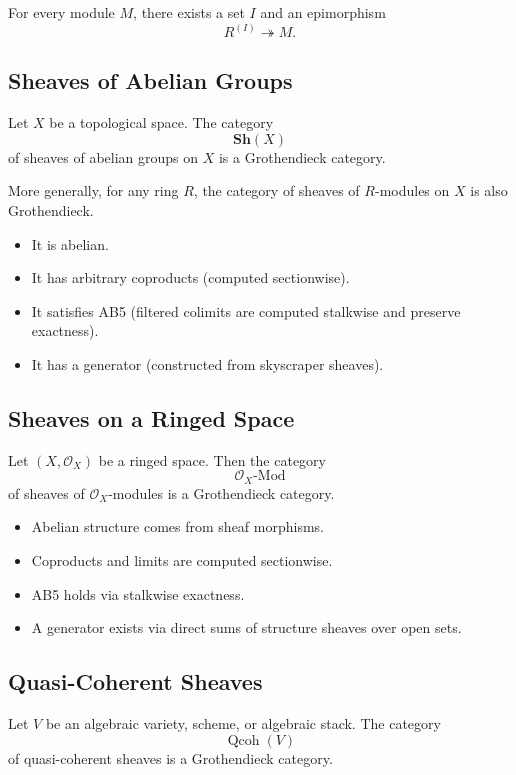 For every module $M$, there exists a set $I$ and an epimorphism
\[
R^{(I)} \twoheadrightarrow M.
\]

\subsection{Sheaves of Abelian Groups}

Let $X$ be a topological space. The category
\[
\mathbf{Sh}(X)
\]
of sheaves of abelian groups on $X$ is a Grothendieck category.

More generally, for any ring $R$, the category of sheaves of $R$-modules on $X$ is also Grothendieck.

\begin{itemize}
    \item It is abelian.
    \item It has arbitrary coproducts (computed sectionwise).
    \item It satisfies AB5 (filtered colimits are computed stalkwise and preserve exactness).
    \item It has a generator (constructed from skyscraper sheaves).
\end{itemize}

\subsection{Sheaves on a Ringed Space}

Let $(X, \mathcal{O}_X)$ be a ringed space. Then the category
\[
\mathcal{O}_X\text{-Mod}
\]
of sheaves of $\mathcal{O}_X$-modules is a Grothendieck category.

\begin{itemize}
    \item Abelian structure comes from sheaf morphisms.
    \item Coproducts and limits are computed sectionwise.
    \item AB5 holds via stalkwise exactness.
    \item A generator exists via direct sums of structure sheaves over open sets.
\end{itemize}

\subsection{Quasi-Coherent Sheaves}

Let $V$ be an algebraic variety, scheme, or algebraic stack. The category
\[
\operatorname{Qcoh}(V)
\]
of quasi-coherent sheaves is a Grothendieck category.


